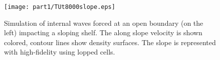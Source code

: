 \begin{figure}
\begin{center}
  \texttt{[image: part1/TUt8000slope.eps]}
\end{center}
\caption{Simulation of internal waves forced at an open boundary (on the left)
impacting a sloping shelf. The along slope velocity is shown colored, contour
lines show density surfaces. The slope is represented with high-fidelity using
lopped cells.}
\label{fig:boundary-forced-wave}
\end{figure}
